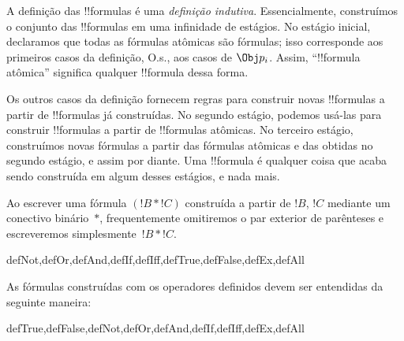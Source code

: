 \documentclass[../../../include/open-logic-section]{subfiles}
\begin{document}
\begin{explain}
A definição das !!{formula}s é uma \emph{definição indutiva}.
Essencialmente, construímos o conjunto das !!{formula}s em uma
infinidade de estágios. No estágio inicial, declaramos que todas as
fórmulas atômicas são fórmulas; isso corresponde aos primeiros casos
da definição, O.s.\@, aos casos de
%
%
$\Obj p_i$. Assim, ``!!{formula} atômica'' significa qualquer
!!{formula} dessa forma.

Os outros casos da definição fornecem regras para construir novas
!!{formula}s a partir de !!{formula}s já construídas. No segundo
estágio, podemos usá-las para construir !!{formula}s a partir de
!!{formula}s atômicas. No terceiro estágio, construímos novas fórmulas
a partir das fórmulas atômicas e das obtidas no segundo estágio, e
assim por diante. Uma !!{formula} é qualquer coisa que acaba sendo
construída em algum desses estágios, e nada mais.
\end{explain}

Ao escrever uma fórmula $(!B \ast !C)$ construída a partir de $!B$,
$!C$ mediante um conectivo binário~$\ast$, frequentemente omitiremos
o par exterior de parênteses e escreveremos simplesmente~$!B \ast !C$.

\begin{tagblock}{defNot,defOr,defAnd,defIf,defIff,defTrue,defFalse,defEx,defAll}
\begin{defn}
As fórmulas construídas com os operadores definidos devem ser
entendidas da seguinte maneira:

\begin{tagenumerate}{defTrue,defFalse,defNot,defOr,defAnd,defIf,defIff,defEx,defAll}







\end{tagenumerate}
\end{defn}
\end{tagblock}
\end{document}
